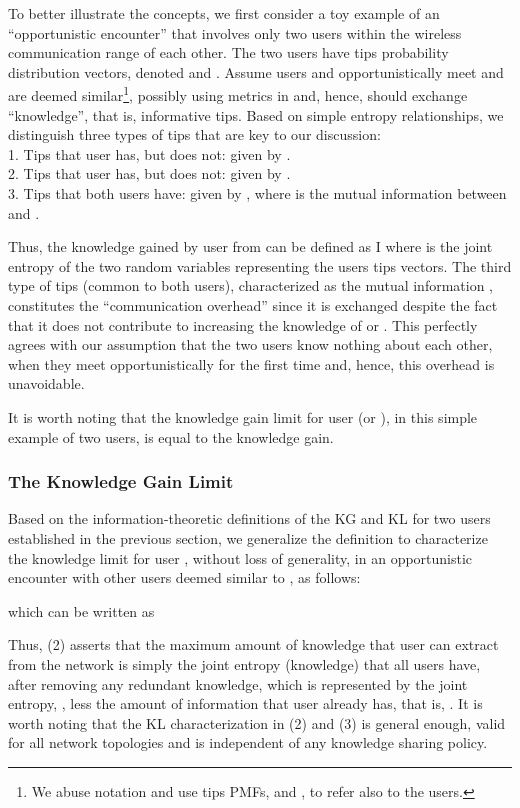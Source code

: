 \documentclass[conference]{IEEEtran}
\theoremstyle{definition}
\begin{document}
To better illustrate the concepts, we first consider a toy example of an ``opportunistic encounter'' that involves only two users within the wireless communication range of each other. The two users have tips probability distribution vectors, denoted  and . Assume users  and  opportunistically meet and are deemed similar\footnote{We abuse notation and use tips PMFs,  and , to refer also to the users.}, possibly using metrics in \cite{mai14} and, hence, should exchange ``knowledge'', that is, informative tips. Based on simple entropy relationships, 
we distinguish three types of tips that are key to our discussion:\\
1. Tips that user  has, but  does not: given by .\\
2. Tips that user  has, but  does not: given by .\\
3. Tips that both users have: given by , where  is the mutual information between  and .


Thus, the knowledge gained by user  from  can be defined as
I
where  is the joint entropy of the two random variables representing the users tips vectors.
The third type of tips (common to both users), characterized as the mutual information , constitutes the ``communication overhead'' since it is exchanged despite the fact that it does not contribute to increasing the knowledge of  or . This perfectly 
agrees with our assumption that the two users know nothing about each other, when they meet opportunistically for the first time and, hence, this overhead is unavoidable.


It is worth noting that the knowledge gain limit for user  (or ), in this simple example of two users, is equal to the knowledge gain. 

\subsubsection{The Knowledge Gain Limit}
Based on the information-theoretic definitions of the KG and KL for two users established in the previous section, we generalize the definition to characterize the knowledge limit for user , without loss of generality, in an opportunistic encounter with  other users deemed similar to , as follows: 
\vspace{-0.1 cm}

which can be written as
\vspace{-0.1 cm}



\vspace{-0.2 cm}
Thus, (2) asserts that the maximum amount of knowledge that user  can extract from the network is simply the joint entropy (knowledge) that all users have, after removing any redundant knowledge, which is represented by the joint entropy, , less the amount of information that user  already has, that is, . It is worth noting that the KL characterization in (2) and (3) is general enough, valid for all network topologies and is independent of any knowledge sharing policy.
\end{document}
